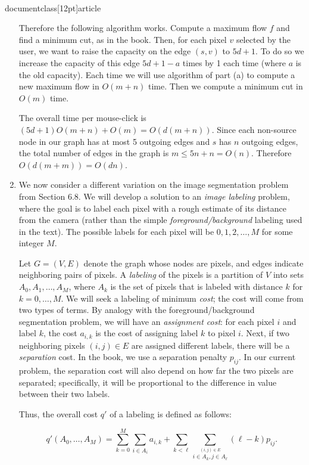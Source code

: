 \\documentclass[12pt]{article}
\begin{document}
\begin{enumerate}
{Therefore the following algorithm works.
Compute a maximum flow $f$ and find a minimum cut, as in the book.
Then, for each pixel $v$ selected by the user, we want to
raise the capacity on the edge $(s,v)$ to $5d + 1$.
To do so we increase the capacity of this edge $5d + 1-a$ times by 1 each time
(where $a$ is the old capacity). Each time we will use algorithm of part (a) to
compute a new maximum flow in $O(m+n)$ time.
Then we compute a minimum cut in $O(m)$ time.

The overall time per mouse-click is $(5d+1)O(m+n)+O(m)=O(d(m+n))$.
Since each non-source node in our graph has at most 5 outgoing edges
and $s$ has $n$ outgoing edges, the total number of edges in the graph is
$m\le 5n+n=O(n)$. Therefore $O(d(m+m))=O(dn)$.

}


\item 

We now consider a different variation on the
image segmentation problem from Section 6.8.
We will develop a solution to an {\em image labeling} problem,
where the goal is to label each pixel with a rough
estimate of its distance from the camera
(rather than the simple {\em foreground/background}
labeling used in the text).
The possible labels for each pixel will be
$0, 1, 2, \ldots, M$ for some integer $M$.

Let $G=(V,E)$ denote the graph whose nodes are pixels, and edges
indicate neighboring pairs of pixels. A {\em labeling}
of the pixels is a partition
of $V$ into sets $A_0, A_1, \ldots, A_M$,
where $A_k$ is the set of pixels that
is labeled with distance $k$ for $k=0, \ldots, M$.
We will seek a labeling of minimum {\em cost};
the cost will come from two types of terms.
By analogy with the foreground/background
segmentation problem, we will have an {\em assignment cost}:
for each pixel $i$ and label $k$, the cost $a_{i,k}$ is the
cost of assigning label $k$ to pixel $i$.
Next, if two neighboring pixels
$(i,j)\in E$ are assigned different labels, there will be a
{\em separation} cost. In the book, we use a separation
penalty $p_{ij}$. In our current problem, the separation
cost will also depend on how far the two pixels
are separated; specifically, it will be proportional
to the difference in value between their two labels.

Thus, the overall cost $q'$ of a labeling is defined as follows:

$$q'(A_0,\ldots,A_M)=\sum_{k=0}^M \sum_{i \in A_i} a_{i,k} +
\sum_{k<\ell}
\sum_{\stackrel{(i,j) \in E}{i\in A_k, j \in A_\ell}} (\ell-k)p_{ij}.$$


\end{enumerate}
\end{document}
